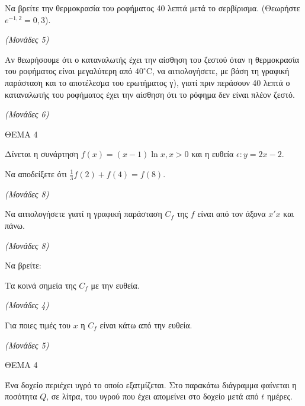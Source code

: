 \documentclass[11pt,a4paper,twoside]{book}
\newcommand{\monades}[1]{\hfill \textit{(Μονάδες #1)}}
\begin{document}
\begin{alist}
\item Να βρείτε την θερμοκρασία του ροφήματος 40 λεπτά μετά το σερβίρισμα. (Θεωρήστε $e^{-1,2} = 0,3$).

\monades{5}

\item Αν θεωρήσουμε ότι ο καταναλωτής έχει την αίσθηση του ζεστού όταν η θερμοκρασία του ροφήματος είναι μεγαλύτερη από $40^\circ\text{C}$, να αιτιολογήσετε, με βάση τη γραφική παράσταση και το αποτέλεσμα του ερωτήματος γ), γιατί πριν περάσουν 40 λεπτά ο καταναλωτής του ροφήματος έχει την αίσθηση ότι το ρόφημα δεν είναι πλέον ζεστό.

\monades{6}
\end{alist}

\vspace{4mm}

ΘΕΜΑ 4

Δίνεται η συνάρτηση $f(x) = (x - 1) \ln x, x > 0$ και η ευθεία $\epsilon: y = 2x - 2$.

\begin{alist}
\item Να αποδείξετε ότι $\frac{1}{3} f(2) + f(4) = f(8)$.

\monades{8}

\item Να αιτιολογήσετε γιατί η γραφική παράσταση $C_f$ της $f$ είναι από τον άξονα $x'x$ και πάνω.

\monades{8}

\item Να βρείτε:

\end{alist}
\begin{alist}
\item
  Τα κοινά σημεία της $C_f$ με την ευθεία.

\monades{4}


\end{alist}
\begin{alist}
\item
  Για ποιες τιμές του $x$ η $C_f$ είναι κάτω από την ευθεία.

\monades{5}
\end{alist}

\vspace{4mm}

ΘΕΜΑ 4

Ένα δοχείο περιέχει υγρό το οποίο εξατμίζεται. Στο παρακάτω διάγραμμα φαίνεται η ποσότητα $Q$, σε λίτρα, του υγρού που έχει απομείνει στο δοχείο μετά από $t$ ημέρες.
\end{document}
